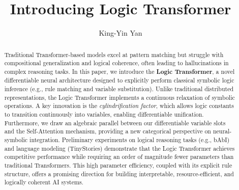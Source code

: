 \documentclass[runningheads]{llncs}
\begin{document}
%
\title{Introducing Logic Transformer}
%
%
\author{King-Yin Yan }
%
%
%
\maketitle              %
%
\begin{abstract}
	Traditional Transformer-based models excel at pattern matching but struggle with compositional generalization and logical coherence, often leading to hallucinations in complex reasoning tasks. In this paper, we introduce the \textbf{Logic Transformer}, a novel differentiable neural architecture designed to explicitly perform classical symbolic logic inference (e.g., rule matching and variable substitution). Unlike traditional distributed representations, the Logic Transformer implements a continuous relaxation of symbolic operations. A key innovation is the \textit{cylindrification factor}, which allows logic constants to transition continuously into variables, enabling differentiable unification. Furthermore, we draw an algebraic parallel between our differentiable variable slots and the Self-Attention mechanism, providing a new categorical perspective on neural-symbolic integration. Preliminary experiments on logical reasoning tasks (e.g., bAbI) and language modeling (TinyStories) demonstrate that the Logic Transformer achieves competitive performance while requiring an order of magnitude fewer parameters than traditional Transformers. This high parameter efficiency, coupled with its explicit rule structure, offers a promising direction for building interpretable, resource-efficient, and logically coherent AI systems.
\end{abstract}


\end{document}
